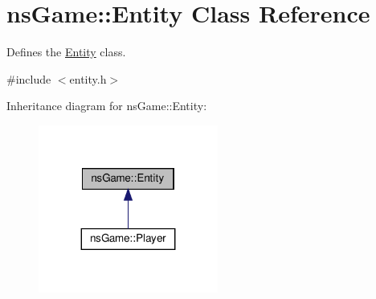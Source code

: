 \hypertarget{classns_game_1_1_entity}{}\section{ns\+Game\+:\+:Entity Class Reference}
\label{classns_game_1_1_entity}


Defines the \hyperlink{classns_game_1_1_entity}{Entity} class.  




{\ttfamily \#include $<$entity.\+h$>$}



Inheritance diagram for ns\+Game\+:\+:Entity\+:\nopagebreak
\begin{figure}[H]
\begin{center}
\leavevmode
\includegraphics[width=167pt]{classns_game_1_1_entity__inherit__graph}
\end{center}
\end{figure}
